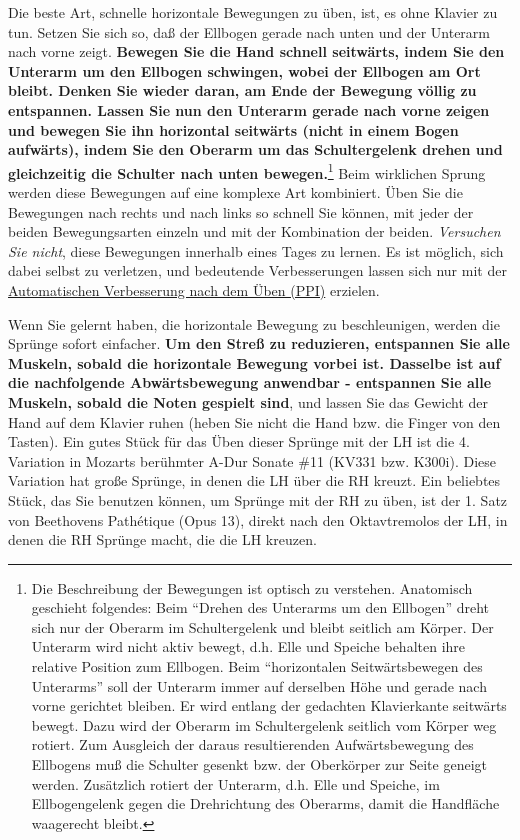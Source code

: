 Die beste Art, schnelle horizontale Bewegungen zu üben, ist, es ohne Klavier zu tun.
Setzen Sie sich so, daß der Ellbogen gerade nach unten und der Unterarm nach vorne zeigt.
\textbf{Bewegen Sie die Hand schnell seitwärts, indem Sie den Unterarm um den Ellbogen schwingen, wobei der Ellbogen am Ort bleibt.
Denken Sie wieder daran, am Ende der Bewegung völlig zu entspannen.
Lassen Sie nun den Unterarm gerade nach vorne zeigen und bewegen Sie ihn horizontal seitwärts (nicht in einem Bogen aufwärts), indem Sie den Oberarm um das Schultergelenk drehen und gleichzeitig die Schulter nach unten bewegen.}\footnote{Die Beschreibung der Bewegungen ist optisch zu verstehen.
Anatomisch geschieht folgendes:
Beim \enquote{Drehen des Unterarms um den Ellbogen} dreht sich nur der Oberarm im Schultergelenk und bleibt seitlich am Körper.
Der Unterarm wird nicht aktiv bewegt, d.h. Elle und Speiche behalten ihre relative Position zum Ellbogen.
Beim \enquote{horizontalen Seitwärtsbewegen des Unterarms} soll der Unterarm immer auf derselben Höhe und gerade nach vorne gerichtet bleiben.
Er wird entlang der gedachten Klavierkante seitwärts bewegt.
Dazu wird der Oberarm im Schultergelenk seitlich vom Körper weg rotiert.
Zum Ausgleich der daraus resultierenden Aufwärtsbewegung des Ellbogens muß die Schulter gesenkt bzw. der Oberkörper zur Seite geneigt werden.
Zusätzlich rotiert der Unterarm, d.h. Elle und Speiche, im Ellbogengelenk gegen die Drehrichtung des Oberarms, damit die Handfläche waagerecht bleibt.}
Beim wirklichen Sprung werden diese Bewegungen auf eine komplexe Art kombiniert.
Üben Sie die Bewegungen nach rechts und nach links so schnell Sie können, mit jeder der beiden Bewegungsarten einzeln und mit der Kombination der beiden.
\textit{Versuchen Sie nicht}, diese Bewegungen innerhalb eines Tages zu lernen.
Es ist möglich, sich dabei selbst zu verletzen, und bedeutende Verbesserungen lassen sich nur mit der \hyperref[c1ii15]{Automatischen Verbesserung nach dem Üben (PPI)} erzielen.

Wenn Sie gelernt haben, die horizontale Bewegung zu beschleunigen, werden die Sprünge sofort einfacher.
\textbf{Um den Streß zu reduzieren, entspannen Sie alle Muskeln, sobald die horizontale Bewegung vorbei ist.
Dasselbe ist auf die nachfolgende Abwärtsbewegung anwendbar - entspannen Sie alle Muskeln, sobald die Noten gespielt sind}, und lassen Sie das Gewicht der Hand auf dem Klavier ruhen (heben Sie nicht die Hand bzw. die Finger von den Tasten).
Ein gutes Stück für das Üben dieser Sprünge mit der LH ist die 4. Variation in Mozarts berühmter A-Dur Sonate \#11 (KV331 bzw. K300i).
Diese Variation hat große Sprünge, in denen die LH über die RH kreuzt.
Ein beliebtes Stück, das Sie benutzen können, um Sprünge mit der RH zu üben, ist der 1. Satz von Beethovens Pathétique (Opus 13), direkt nach den Oktavtremolos der LH, in denen die RH Sprünge macht, die die LH kreuzen.

